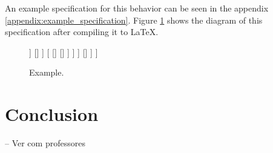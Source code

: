 \documentclass[a4paper,UKenglish,cleveref, autoref, thm-restate]{oasics-v2019}
\begin{document}
An example specification for this behavior can be seen in the appendix \ref{appendix:example_specification}.
Figure \ref{fig:example} shows the diagram of this specification after compiling it to \LaTeX.
\begin{figure}
    \centering
    \begin{behavior}
        [\rootnode
            [\selector
                [\memorysequence
                    [\condition{sees player}]
                    [\action{activate alarm}]
                    [\memoryprobselector
                        [\probnodesequence{$e1$}
                            [\inverter
                                [\condition{player dead}]
                            ]
                            []
                        ]
                        [
                            []
                            []
                        ]
                    ]
                ]
                []
            ]
        ]
    \end{behavior}
    \caption{Example.}
    \label{fig:example}
\end{figure}

\section{Conclusion}
\label{sec:conclusion}

-- Ver com professores


\end{document}
